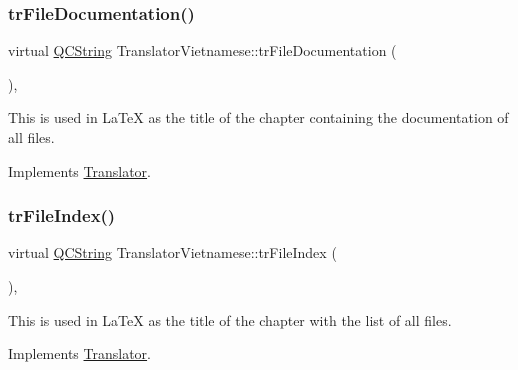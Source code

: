 \mbox{\label{class_translator_vietnamese_a5ff58b67251c89c1855fca84af6a1837}} 
\subsubsection{\texorpdfstring{trFileDocumentation()}{trFileDocumentation()}}
{\footnotesize\ttfamily virtual \mbox{\hyperlink{class_q_c_string}{Q\+C\+String}} Translator\+Vietnamese\+::tr\+File\+Documentation (\begin{DoxyParamCaption}{ }\end{DoxyParamCaption})\hspace{0.3cm}{\ttfamily [inline]}, {\ttfamily [virtual]}}

This is used in La\+TeX as the title of the chapter containing the documentation of all files. 

Implements \mbox{\hyperlink{class_translator}{Translator}}.

\mbox{\label{class_translator_vietnamese_a792242814890aa7d197b690fc1ced90c}} 
\subsubsection{\texorpdfstring{trFileIndex()}{trFileIndex()}}
{\footnotesize\ttfamily virtual \mbox{\hyperlink{class_q_c_string}{Q\+C\+String}} Translator\+Vietnamese\+::tr\+File\+Index (\begin{DoxyParamCaption}{ }\end{DoxyParamCaption})\hspace{0.3cm}{\ttfamily [inline]}, {\ttfamily [virtual]}}

This is used in La\+TeX as the title of the chapter with the list of all files. 

Implements \mbox{\hyperlink{class_translator}{Translator}}.

\mbox{\label{class_translator_vietnamese_af61fca05266b5000476826685e828c25}} 
